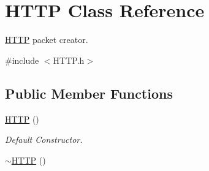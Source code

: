 \hypertarget{class_h_t_t_p}{}\section{H\+T\+TP Class Reference}
\label{class_h_t_t_p}


\hyperlink{class_h_t_t_p}{H\+T\+TP} packet creator.  




{\ttfamily \#include $<$H\+T\+T\+P.\+h$>$}

\subsection*{Public Member Functions}
\begin{DoxyCompactItemize}
\item 
\hyperlink{class_h_t_t_p_a32bbc9d32ae66d0f3ee05c206a39c0af}{H\+T\+TP} ()\hypertarget{class_h_t_t_p_a32bbc9d32ae66d0f3ee05c206a39c0af}{}\label{class_h_t_t_p_a32bbc9d32ae66d0f3ee05c206a39c0af}

\begin{DoxyCompactList}\small\item\em Default Constructor. \end{DoxyCompactList}\item 
\hyperlink{class_h_t_t_p_ae252d5f9c5114a0976bd3993bfcd8563}{$\sim$\+H\+T\+TP} ()\hypertarget{class_h_t_t_p_ae252d5f9c5114a0976bd3993bfcd8563}{}\label{class_h_t_t_p_ae252d5f9c5114a0976bd3993bfcd8563}


\end{DoxyCompactItemize}

